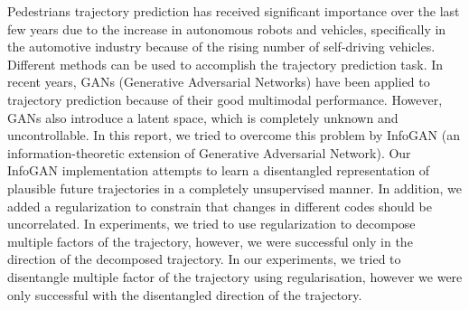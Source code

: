 Pedestrians trajectory prediction has received significant importance over the last few years due to the increase in autonomous robots and vehicles, specifically in the automotive industry because of the rising number of self-driving vehicles. Different methods can be used to accomplish the trajectory prediction task. In recent years, GANs (Generative Adversarial Networks) have been applied to trajectory prediction because of their good multimodal performance. However, GANs also introduce a latent space, which is completely unknown and uncontrollable. In this report, we tried to overcome this problem by InfoGAN (an information-theoretic extension of Generative Adversarial Network). Our InfoGAN implementation attempts to learn a disentangled representation of plausible future trajectories in a completely unsupervised manner. In addition, we added a regularization to constrain that changes in different codes should be uncorrelated.
In experiments, we tried to use regularization to decompose multiple factors of the trajectory, however, we were successful only in the direction of the decomposed trajectory. In our experiments, we tried to disentangle multiple factor of the trajectory using regularisation, however we were only successful with the disentangled direction of the trajectory.